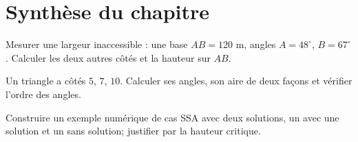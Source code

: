\section*{Synthèse du chapitre}
\begin{synthesisbox}
\item Mesurer une largeur inaccessible : une base $AB=120$ m, angles $A=48^\circ$, $B=67^\circ$. Calculer les deux autres côtés et la hauteur sur $AB$.
\item Un triangle a côtés $5$, $7$, $10$. Calculer ses angles, son aire de deux façons et vérifier l'ordre des angles.
\item Construire un exemple numérique de cas SSA avec deux solutions, un avec une solution et un sans solution; justifier par la hauteur critique.
\end{synthesisbox}
